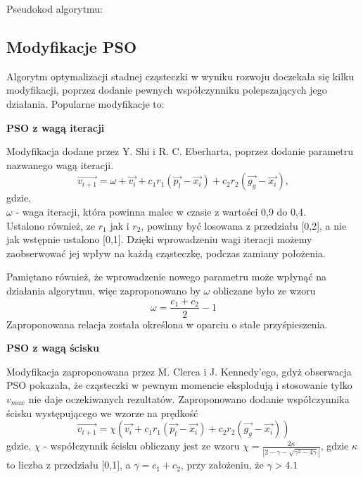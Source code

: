 \documentclass[twoside]{pracaMagisterskaMS}
\begin{document}
Pseudokod algorytmu: 


\subsection{Modyfikacje PSO}
Algorytm optymalizacji stadnej cząsteczki w wyniku rozwoju doczekała się kilku modyfikacji, poprzez dodanie pewnych współczynniku polepszających jego działania. Popularne modyfikacje to:

\textbf{PSO z wagą iteracji} 

Modyfikacja dodane przez Y. Shi i R. C. Eberharta, poprzez dodanie parametru nazwanego wagą iteracji.
\begin{equation}
\vec{v_{i+1}} = \omega + \vec{v_{i}} + c_1 r_1 (\vec{p_{l}} - \vec{x_{i}}) + c_2 r_2 (\vec{g_{g}} - \vec{x_{i}}),
\end{equation}
gdzie,\\
$\omega$ - waga iteracji, która powinna malec w czasie z wartości 0,9 do 0,4. \\

Ustalono również, ze $r_1$ jak i $r_2$, powinny być losowana z przedziału [0,2], a nie jak wstępnie ustalono [0,1]. Dzięki wprowadzeniu wagi iteracji możemy zaobserwować jej wpływ na każdą cząsteczkę, podczas zamiany położenia.

Pamiętano również, że wprowadzenie nowego parametru może wpłynąć na działania algorytmu, więc zaproponowano by $\omega$ obliczane było ze wzoru 
  \begin{equation}
  \omega = \frac {c_1 + c_2}{2} - 1 
  \end{equation}
Zaproponowana relacja została określona w oparciu o stałe przyśpieszenia.

\textbf{PSO z wagą ścisku}

Modyfikacja zaproponowana przez M. Clerca i J. Kennedy’ego, gdyż obserwacja PSO pokazała, że cząsteczki w pewnym momencie eksplodują i stosowanie tylko $v_{max}$ nie daje oczekiwanych rezultatów. Zaproponowano dodanie współczynnika ścisku występującego we wzorze na prędkość
\begin{equation}
\vec{v_{i+1}} = \chi (\vec{v_{i}} + c_1 r_1 (\vec{p_{l}} - \vec{x_{i}}) + c_2 r_2 (\vec{g_{g}} - \vec{x_{i}}))
\end{equation}
gdzie,
$\chi$ - współczynnik ścisku obliczany jest ze wzoru $\chi = \frac{2\kappa}{\left| 2 - \gamma - \sqrt{\gamma^2 - 4 \gamma} \right|}$, gdzie $\kappa$ to liczba z przedziału [0,1], a $\gamma = c_1 +c_2$, przy założeniu, że $\gamma > 4.1$
\end{document}
